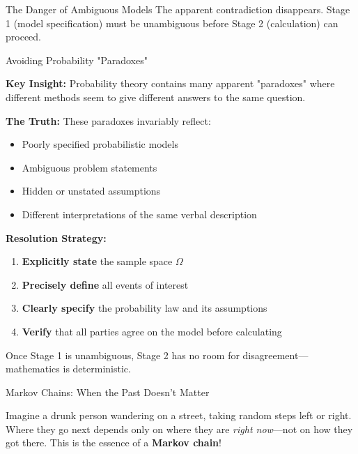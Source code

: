 \begin{itemize}
\begin{exampleboxbreak}{The Danger of Ambiguous Models}
The apparent contradiction disappears. Stage 1 (model specification) must be unambiguous before Stage 2 (calculation) can proceed.

\end{exampleboxbreak}

\begin{keyconceptboxbreak}{Avoiding Probability "Paradoxes"}

\textbf{Key Insight:} Probability theory contains many apparent "paradoxes" where different methods seem to give different answers to the same question.

\textbf{The Truth:} These paradoxes invariably reflect:
\begin{itemize}
    \item Poorly specified probabilistic models
    \item Ambiguous problem statements
    \item Hidden or unstated assumptions
    \item Different interpretations of the same verbal description
\end{itemize}

\textbf{Resolution Strategy:}
\begin{enumerate}
    \item \textbf{Explicitly state} the sample space $\Omega$
    \item \textbf{Precisely define} all events of interest
    \item \textbf{Clearly specify} the probability law and its assumptions
    \item \textbf{Verify} that all parties agree on the model before calculating
\end{enumerate}

Once Stage 1 is unambiguous, Stage 2 has no room for disagreement—mathematics is deterministic.

\end{keyconceptboxbreak}

\begin{funfactsbreak}{Markov Chains: When the Past Doesn't Matter}


Imagine a drunk person wandering on a street, taking random steps left or right. Where they go next depends only on where they are \textit{right now}—not on how they got there. This is the essence of a \textbf{Markov chain}!



\end{funfactsbreak}
\end{itemize}
